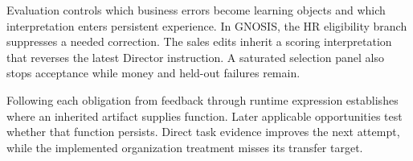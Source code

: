 \documentclass{ecai}
\begin{document}
Evaluation controls which business errors become learning objects and which interpretation enters persistent experience. In GNOSIS, the HR eligibility branch suppresses a needed correction. The sales edits inherit a scoring interpretation that reverses the latest Director instruction. A saturated selection panel also stops acceptance while money and held-out failures remain.

Following each obligation from feedback through runtime expression establishes where an inherited artifact supplies function. Later applicable opportunities test whether that function persists. Direct task evidence improves the next attempt, while the implemented organization treatment misses its transfer target.

\balance

\clearpage
\nobalance
\appendix
\raggedbottom

\end{document}
